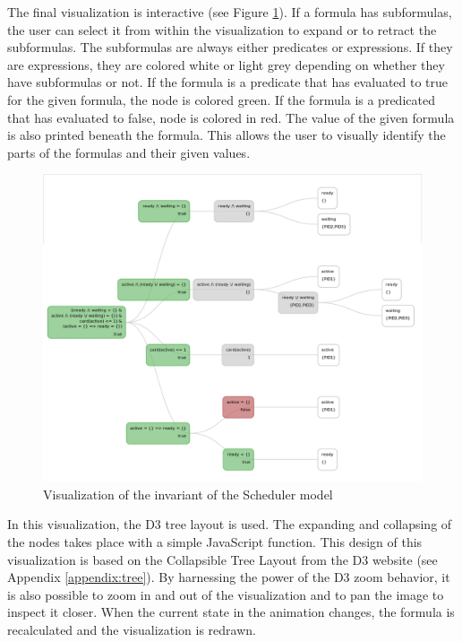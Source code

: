 The final visualization is interactive (see Figure \ref{predicate}). If a formula has subformulas, the user can select it from within the visualization to expand or to retract the subformulas. The subformulas are always either predicates or expressions. If they are expressions, they are colored white or light grey depending on whether they have subformulas or not. If the formula is a predicate that has evaluated to true for the given formula, the node is colored green. If the formula is a predicated that has evaluated to false, node is colored in red. The value of the given formula is also printed beneath the formula. This allows the user to visually identify the parts of the formulas and their given values. 

\begin{center}
\begin{figure}[h!]
\centering
\includegraphics[width=14cm]{bilder/invariant.png}
\caption{Visualization of the invariant of the Scheduler model}
\label{predicate}
\end{figure}
\end{center}

In this visualization, the D3 tree layout is used. The expanding and collapsing of the nodes takes place with a simple JavaScript function. This design of this visualization is based on the Collapsible Tree Layout from the D3 website (see Appendix \ref{appendix:tree}). By harnessing the power of the D3 zoom behavior, it is also possible to zoom in and out of the visualization and to pan the image to inspect it closer. When the current state in the animation changes, the formula is recalculated and the visualization is redrawn.

